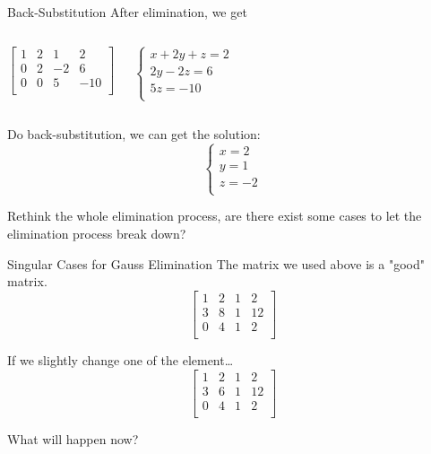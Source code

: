 \documentclass{beamer}
\begin{document}
\begin{frame}{Back-Substitution}
After elimination, we get
\begin{columns}
    \begin{equation*}
        \left[ \begin{matrix}
            1&		2&		1&		2\\
            0&		2&		-2&		6\\
            0&		0&		5&		-10\\
        \end{matrix} \right]
    \end{equation*}

    \begin{equation*}
        \begin{cases}
            x+2y+z=2\\
            2y-2z=6\\
            5z=-10\\
        \end{cases}
    \end{equation*}
\end{columns}
Do back-substitution, we can get the solution:
\begin{equation*}
    \begin{cases}
        x=2\\
        y=1\\
        z=-2\\
    \end{cases}
\end{equation*}

Rethink the whole elimination process, are there exist some cases to let the elimination process break down?
\end{frame}

\begin{frame}{Singular Cases for Gauss Elimination}
The matrix we used above is a "good" matrix.
\begin{equation*}
    \left[ \begin{matrix}
        1&		2&		1&		2\\
        3&		8&		1&		12\\
        0&		4&		1&		2\\
    \end{matrix} \right]
\end{equation*}

If we slightly change one of the element\dots
\begin{equation*}
    \left[ \begin{matrix}
        1&		2&		1&		2\\
        3&		6&		1&		12\\
        0&		4&		1&		2\\
    \end{matrix} \right]
\end{equation*}

What will happen now?
\end{frame}
\end{document}
